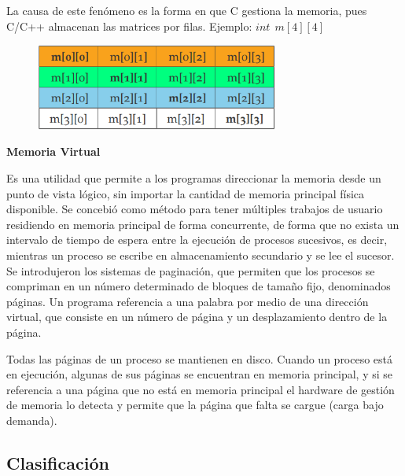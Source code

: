 \documentclass{article}
\begin{document}
La causa de este fenómeno es la forma en que C gestiona la memoria, pues C/C++ almacenan las matrices por filas. Ejemplo: $int\:\:m[4][4]$
\begin{figure}[h]
\centering
\includegraphics[scale=0.6,width=80mm]{ejemplo4x4.png}
\end{figure}

\textbf{Memoria Virtual}

Es una utilidad que permite a los programas direccionar la memoria desde un punto de vista lógico, sin importar la cantidad de memoria principal física disponible. Se concebió como método para tener múltiples trabajos de usuario residiendo en memoria principal de forma concurrente, de forma que no exista un intervalo de tiempo de espera entre la ejecución de procesos sucesivos, es decir, mientras un proceso se escribe en almacenamiento secundario y se lee el sucesor. Se introdujeron los sistemas de paginación, que permiten que los procesos se compriman en un número determinado de bloques de tamaño fijo, denominados páginas. Un programa referencia a una palabra por medio de una dirección virtual, que consiste en un número de página y un desplazamiento dentro de la página.

Todas las páginas de un proceso se mantienen en disco. Cuando un proceso está en ejecución, algunas de sus páginas se encuentran en memoria principal, y si se referencia a una página que no está en memoria principal el hardware de gestión de memoria lo detecta y permite que la página que falta se cargue (carga bajo demanda).

\subsection{Clasificación}
\end{document}
